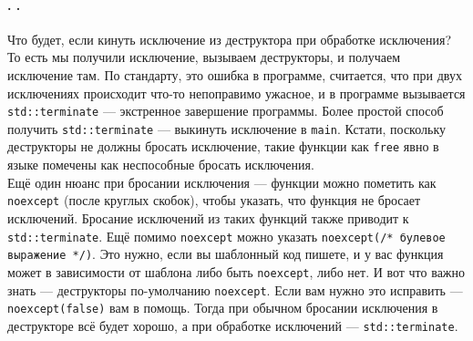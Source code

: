 \documentclass{article}
\begin{document}
    \paragraph{. .}
    Что будет, если кинуть исключение из деструктора при обработке исключения? То есть мы получили исключение, вызываем деструкторы, и получаем исключение там. По стандарту, это ошибка в программе, считается, что при двух исключениях происходит что-то непоправимо ужасное, и в программе вызывается \texttt{std::terminate} --- экстренное завершение программы. Более простой способ получить \texttt{std::terminate} --- выкинуть исключение в \texttt{main}. Кстати, поскольку деструкторы не должны бросать исключение, такие функции как \texttt{free} явно в языке помечены как неспособные бросать исключения.\\
    Ещё один нюанс при бросании исключения --- функции можно пометить как \texttt{noexcept} (после круглых скобок), чтобы указать, что функция не бросает исключений. Бросание исключений из таких функций также приводит к \texttt{std::terminate}. Ещё помимо \texttt{noexcept} можно указать \texttt{noexcept(/* булевое выражение */)}. Это нужно, если вы шаблонный код пишете, и у вас функция может в зависимости от шаблона либо быть \texttt{noexcept}, либо нет. И вот что важно знать --- деструкторы по-умолчанию \texttt{noexcept}. Если вам нужно это исправить --- \texttt{noexcept(false)} вам в помощь. Тогда при обычном бросании исключения в деструкторе всё будет хорошо, а при обработке исключений --- \texttt{std::terminate}.
\end{document}
